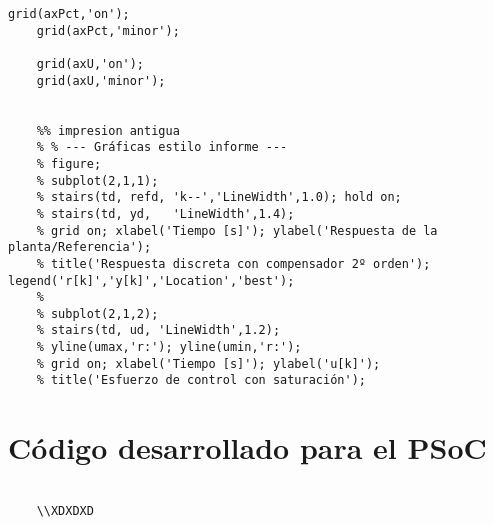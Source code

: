 \begin{lstlisting}[style=matlabstyle,caption={Segunda hoja de cálculos utilizada.},label={matlab:calculo2}]
	grid(axPct,'on');
	grid(axPct,'minor');
	
	grid(axU,'on');
	grid(axU,'minor');
	
	
	%% impresion antigua
	% % --- Gráficas estilo informe ---
	% figure; 
	% subplot(2,1,1);
	% stairs(td, refd, 'k--','LineWidth',1.0); hold on;
	% stairs(td, yd,   'LineWidth',1.4);
	% grid on; xlabel('Tiempo [s]'); ylabel('Respuesta de la planta/Referencia');
	% title('Respuesta discreta con compensador 2º orden'); legend('r[k]','y[k]','Location','best');
	% 
	% subplot(2,1,2);
	% stairs(td, ud, 'LineWidth',1.2);
	% yline(umax,'r:'); yline(umin,'r:');
	% grid on; xlabel('Tiempo [s]'); ylabel('u[k]');
	% title('Esfuerzo de control con saturación');
\end{lstlisting}
\section{Código desarrollado para el PSoC }
\begin{lstlisting}[style=cstyle,
	caption={Código desarrollado para la implementación de los compensadores con el PSoC en lenguaje C.},
	label={c:psoc}
	]
	
	\\XDXDXD
\end{lstlisting}

